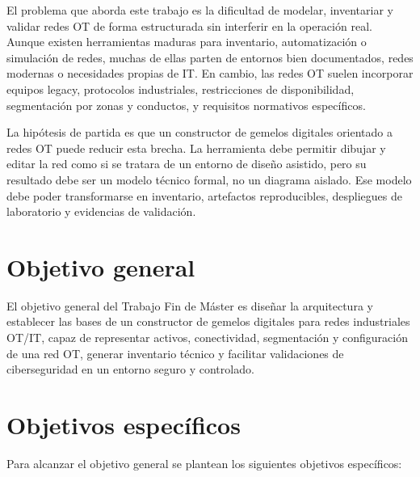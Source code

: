 El problema que aborda este trabajo es la dificultad de modelar, inventariar y validar redes OT de forma estructurada sin interferir en la operación real. Aunque existen herramientas maduras para inventario, automatización o simulación de redes, muchas de ellas parten de entornos bien documentados, redes modernas o necesidades propias de IT. En cambio, las redes OT suelen incorporar equipos legacy, protocolos industriales, restricciones de disponibilidad, segmentación por zonas y conductos, y requisitos normativos específicos.

La hipótesis de partida es que un constructor de gemelos digitales orientado a redes OT puede reducir esta brecha. La herramienta debe permitir dibujar y editar la red como si se tratara de un entorno de diseño asistido, pero su resultado debe ser un modelo técnico formal, no un diagrama aislado. Ese modelo debe poder transformarse en inventario, artefactos reproducibles, despliegues de laboratorio y evidencias de validación.

\section{Objetivo general} \label{sec:objetivo-general}

El objetivo general del Trabajo Fin de Máster es diseñar la arquitectura y establecer las bases de un constructor de gemelos digitales para redes industriales OT/IT, capaz de representar activos, conectividad, segmentación y configuración de una red OT, generar inventario técnico y facilitar validaciones de ciberseguridad en un entorno seguro y controlado.

\section{Objetivos específicos} \label{sec:objetivos-especificos}

Para alcanzar el objetivo general se plantean los siguientes objetivos específicos:


